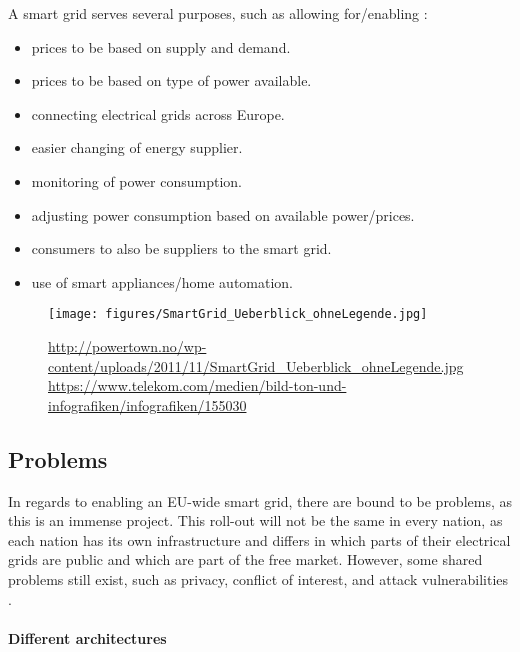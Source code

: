 A smart grid serves several purposes, such as allowing for/enabling \cite{smartgrid_gov} \cite{directive_2009_72_EC}:
\begin{itemize}
	\item prices to be based on supply and demand.
	\item prices to be based on type of power available.
	\item connecting electrical grids across Europe.
	\item easier changing of energy supplier.
	\item monitoring of power consumption.
	\item adjusting power consumption based on available power/prices.
	\item consumers to also be suppliers to the smart grid.
	\item use of smart appliances/home automation.
\end{itemize}

\begin{figure}
	\texttt{[image: figures/SmartGrid\_Ueberblick\_ohneLegende.jpg]}
	\caption{\url{http://powertown.no/wp-content/uploads/2011/11/SmartGrid_Ueberblick_ohneLegende.jpg} \url{https://www.telekom.com/medien/bild-ton-und-infografiken/infografiken/155030}
	}
	\label{fig:background:smartgrid}
\end{figure}

\subsection{Problems}
In regards to enabling an EU-wide smart grid, there are bound to be problems, as this is an immense project.
This roll-out will not be the same in every nation, as each nation has its own infrastructure and differs in which parts of their electrical grids are public and which are part of the free market.
However, some shared problems still exist, such as privacy, conflict of interest, and attack vulnerabilities \cite{offswitch} \cite{smart_meter_survey} \cite{security_economics}.

\paragraph{Different architectures}

